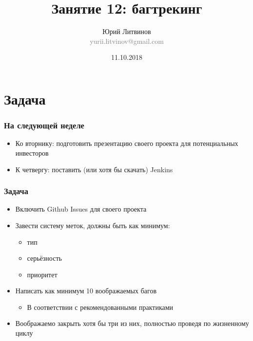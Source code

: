 \documentclass[xetex,mathserif,serif]{beamer}
\title{Занятие 12: багтрекинг}
\author[Юрий Литвинов]{Юрий Литвинов\\\small{\textcolor{gray}{yurii.litvinov@gmail.com}}}
\date{11.10.2018}
\begin{document}
	\frame{\titlepage}

	\section{Задача}
	
	\begin{frame}
		\frametitle{На следующей неделе}
		\begin{itemize}
			\item Ко вторнику: подготовить презентацию своего проекта для потенциальных инвесторов
			\item К четвергу: поставить (или хотя бы скачать) Jenkins
		\end{itemize}
	\end{frame}

	\begin{frame}
		\frametitle{Задача}
		\begin{itemize}
			\item Включить Github Issues для своего проекта
			\item Завести систему меток, должны быть как минимум:
			\begin{itemize}
				\item тип
				\item серьёзность
				\item приоритет
			\end{itemize}
			\item Написать как минимум 10 воображаемых багов
			\begin{itemize}
				\item В соответствии с рекомендованными практиками
			\end{itemize}
			\item Воображаемо закрыть хотя бы три из них, полностью проведя по жизненному циклу
		\end{itemize}
	\end{frame}
\end{document}
